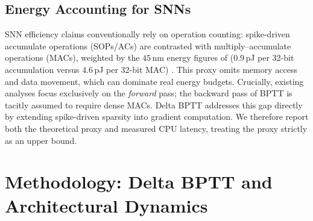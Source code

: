 \documentclass[11pt, conference, compsoc, twoside]{IEEEtran}
\begin{document}
\subsection{Energy Accounting for SNNs}
SNN efficiency claims conventionally rely on operation counting: spike-driven accumulate operations (SOPs/ACs) are contrasted with multiply--accumulate operations (MACs), weighted by the $45$\,nm energy figures of \cite{horowitz2014computing} ($0.9$\,pJ per 32-bit accumulation versus $4.6$\,pJ per 32-bit MAC) \cite{zhou2023spikformer, fang2023spikingjelly}. This proxy omits memory access and data movement, which can dominate real energy budgets. Crucially, existing analyses focus exclusively on the \textit{forward} pass; the backward pass of BPTT is tacitly assumed to require dense MACs. Delta BPTT addresses this gap directly by extending spike-driven sparsity into gradient computation. We therefore report both the theoretical proxy and measured CPU latency, treating the proxy strictly as an upper bound.

\section{Methodology: Delta BPTT and Architectural Dynamics}
\end{document}
